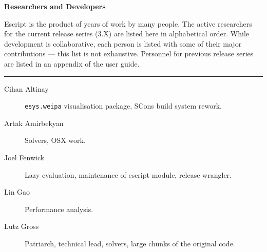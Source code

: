 \vbox{}
\vfill
\begin{center}
\textbf{\Large Researchers and Developers}
\vspace{0.5cm}

Escript is the product of years of work by many people.
The active researchers for the current release series (3.X) are listed here in alphabetical order.
While development is collaborative, each person is listed with some of their major contributions --- this list is not exhaustive.
Personnel for previous release series are listed in an appendix of the user guide.

\vspace{1cm}
\hrule
\vspace{1cm}
\begin{description}
\item[Cihan Altinay] \texttt{esys.weipa} visualisation package, SCons build system rework.
\item[Artak Amirbekyan] Solvers, OSX work.
\item[Joel Fenwick] Lazy evaluation, maintenance of escript module, release wrangler.
\item[Lin Gao] Performance analysis.
\item[Lutz Gross] Patriarch, technical lead, solvers, large chunks of the original code.
\end{description}
\end{center}
\vfill
\pagebreak


